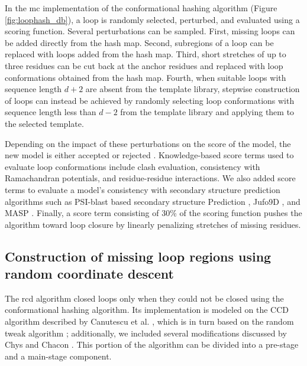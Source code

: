 In the \gls{mc} implementation of the conformational hashing algorithm (Figure \ref{fig:loophash_db}), a loop is randomly selected, perturbed, and evaluated using a scoring function. Several perturbations can be sampled. First, missing loops can be added directly from the hash map. Second, subregions of a loop can be replaced with loops added from the hash map. Third, short stretches of up to three residues can be cut back at the anchor residues and replaced with loop conformations obtained from the hash map. Fourth, when suitable loops with sequence length $d+2$ are absent from the template library, stepwise construction of loops can instead be achieved by randomly selecting loop conformations with sequence length less than $d-2$ from the template library and applying them to the selected template.

Depending on the impact of these perturbations on the score of the model, the new model is either accepted or rejected \citep*{Karakas2012}.  Knowledge-based score terms used to evaluate loop conformations include clash evaluation, consistency with Ramachandran potentials, and residue-residue interactions. We also added score terms to evaluate a model's consistency with secondary structure prediction algorithms such as PSI-blast based secondary structure Prediction \citep*{Jones1999, Ward2003}, Jufo9D \citep*{Leman2013}, and MASP \citep*{Mendenhall2014}. Finally, a score term consisting of 30\% of the scoring function pushes the algorithm toward loop closure by linearly penalizing stretches of missing residues.

\subsection{Construction of missing loop regions using random coordinate descent}

The \gls{rcd} algorithm closed loops only when they could not be closed using the conformational hashing algorithm. Its implementation is modeled on the CCD algorithm described by Canutescu et al. \citep*{Canutescu2003}, which is in turn based on the random tweak algorithm \citep*{Fine1986, Shenkin1987}; additionally, we included several modifications discussed by Chys and Chacon \citep*{Chys2013}. This portion of the algorithm can be divided into a pre-stage and a main-stage component.

